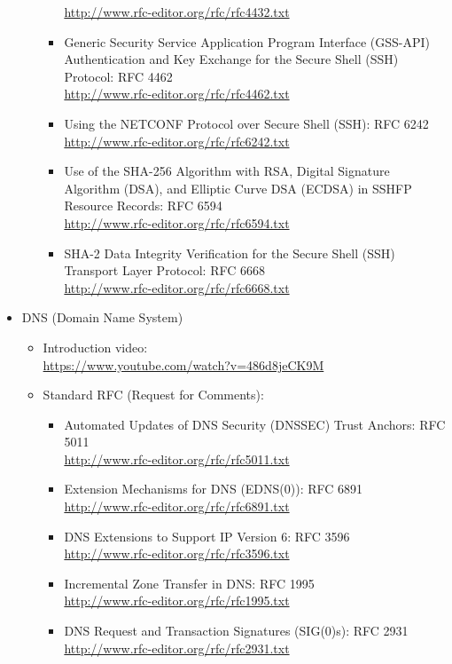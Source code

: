 \begin{itemize}
\begin{itemize}
\begin{itemize}
\url{http://www.rfc-editor.org/rfc/rfc4432.txt}
\item Generic Security Service Application Program Interface (GSS-API) 
Authentication and Key Exchange for the Secure Shell (SSH) Protocol: RFC 4462\\
\url{http://www.rfc-editor.org/rfc/rfc4462.txt}
\item Using the NETCONF Protocol over Secure Shell (SSH): RFC 6242\\
\url{http://www.rfc-editor.org/rfc/rfc6242.txt}
\item Use of the SHA-256 Algorithm with RSA, Digital Signature 
Algorithm (DSA), and Elliptic Curve DSA (ECDSA) in SSHFP Resource 
Records: RFC 6594\\
\url{http://www.rfc-editor.org/rfc/rfc6594.txt}
\item SHA-2 Data Integrity Verification for the Secure Shell (SSH) 
Transport Layer Protocol: RFC 6668\\
\url{http://www.rfc-editor.org/rfc/rfc6668.txt}
\end{itemize}
\end{itemize}
\item DNS (Domain Name System)\\
\begin{itemize}
\item Introduction video:\\
\url{https://www.youtube.com/watch?v=486d8jeCK9M}
\item Standard RFC (Request for Comments): \\
\begin{itemize}
\item Automated Updates of DNS Security (DNSSEC) Trust Anchors: RFC 5011\\
\url{http://www.rfc-editor.org/rfc/rfc5011.txt}
\item Extension Mechanisms for DNS (EDNS(0)): RFC 6891\\
\url{http://www.rfc-editor.org/rfc/rfc6891.txt}
\item DNS Extensions to Support IP Version 6: RFC 3596\\
\url{http://www.rfc-editor.org/rfc/rfc3596.txt}
\item Incremental Zone Transfer in DNS: RFC 1995\\
\url{http://www.rfc-editor.org/rfc/rfc1995.txt}
\item DNS Request and Transaction Signatures (SIG(0)s): RFC 2931\\
\url{http://www.rfc-editor.org/rfc/rfc2931.txt}

\end{itemize}
\end{itemize}
\end{itemize}
